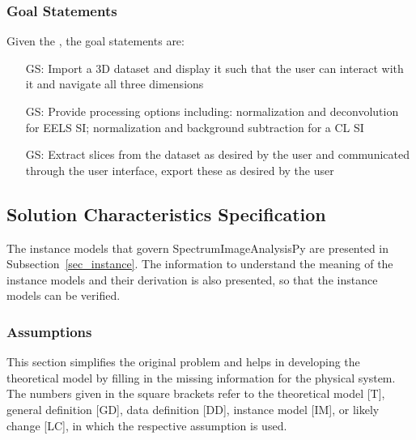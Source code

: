 \documentclass[12pt]{article}
\newcounter{goalnum} %
\newcommand{\progname}{SpectrumImageAnalysisPy} %
\begin{document}
\subsubsection{Goal Statements}

\noindent Given the , the goal statements are:

\begin{itemize}

	\item[GS\refstepcounter{goalnum}\thegoalnum \label{G_ImportDisplay}:] Import a 3D dataset and display it such that the user can interact with it and navigate all three dimensions
	\item[GS\refstepcounter{goalnum}\thegoalnum \label{G_Processing}:] Provide processing options including: normalization and deconvolution for EELS SI; normalization and background subtraction for a CL SI
	\item[GS\refstepcounter{goalnum}\thegoalnum \label{G_Extraction}:] Extract slices from the dataset as desired by the user and communicated through the user interface, export these as desired by the user

\end{itemize}

\subsection{Solution Characteristics Specification}

The instance models that govern \progname{} are presented in
Subsection~\ref{sec_instance}.  The information to understand the meaning of the
instance models and their derivation is also presented, so that the instance
models can be verified.

\subsubsection{Assumptions}

This section simplifies the original problem and helps in developing the
theoretical model by filling in the missing information for the physical
system. The numbers given in the square brackets refer to the theoretical model
[T], general definition [GD], data definition [DD], instance model [IM], or
likely change [LC], in which the respective assumption is used.
\end{document}
